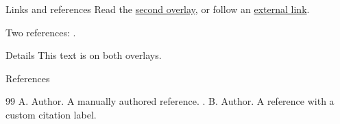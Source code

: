 \documentclass{beamer}
\begin{document}
\begin{frame}[label=intro]{Links and references}
  Read the \hyperlink{details<2>}{second overlay}, or follow an
  \href{https://example.com}{external link}.

  Two references: \cite[p.~12]{manual,custom}.
\end{frame}
\begin{frame}[label=details]{Details}
  This text is on both overlays.

  \hyperlink{intro}{}
\end{frame}
\begin{frame}[label=references]{References}
  \begin{thebibliography}{99}
     A. Author.
      \newblock A manually authored reference.
      .
     B. Author.
      \newblock A reference with a custom citation label.
  \end{thebibliography}
\end{frame}
\end{document}

